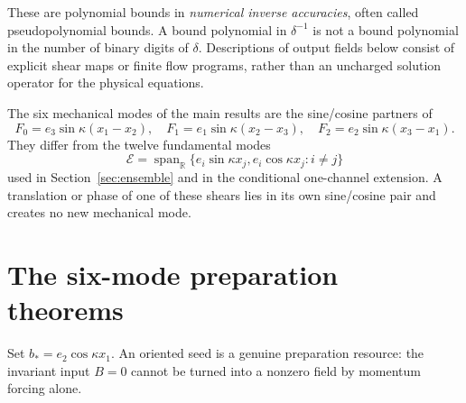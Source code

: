 \documentclass[11pt,a4paper]{amsart}
\theoremstyle{definition}
\theoremstyle{remark}
\numberwithin{equation}{section}
\newcommand{\R}{\mathbb R}
\begin{document}
These are polynomial bounds in \emph{numerical inverse accuracies}, often called pseudopolynomial bounds. A bound polynomial in $\delta^{-1}$ is not a bound polynomial in the number of binary digits of $\delta$. Descriptions of output fields below consist of explicit shear maps or finite flow programs, rather than an uncharged solution operator for the physical equations.

The six mechanical modes of the main results are the sine/cosine partners of
\begin{equation}\label{eq:six}
 F_0=e_3\sin\kappa(x_1-x_2),\quad
 F_1=e_1\sin\kappa(x_2-x_3),\quad
 F_2=e_2\sin\kappa(x_3-x_1).
\end{equation}
They differ from the twelve fundamental modes
\begin{equation}\label{eq:twelve}
 \mathcal E=\operatorname{span}_{\R}
 \{e_i\sin\kappa x_j,e_i\cos\kappa x_j:i\ne j\}
\end{equation}
used in Section~\ref{sec:ensemble} and in the conditional one-channel extension. A translation or phase of one of these shears lies in its own sine/cosine pair and creates no new mechanical mode.



\section{The six-mode preparation theorems}\label{sec:main}

Set $b_*=e_2\cos\kappa x_1$. An oriented seed is a genuine preparation resource: the invariant input $B=0$ cannot be turned into a nonzero field by momentum forcing alone.
\end{document}
